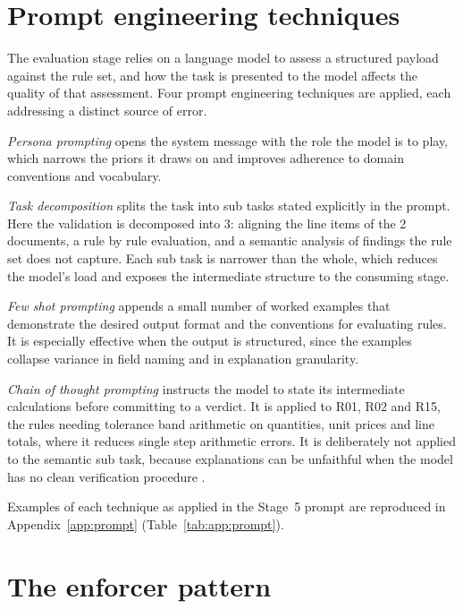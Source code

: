 \section{Prompt engineering techniques}
\label{sec:method:prompt}

The evaluation stage relies on a language model to assess a structured payload against the rule set, and how the task is presented to the model affects the quality of that assessment. Four prompt engineering techniques are applied, each addressing a distinct source of error.

\emph{Persona prompting} \citep{salewski2024} opens the system message with the role the model is to play, which narrows the priors it draws on and improves adherence to domain conventions and vocabulary.

\emph{Task decomposition} \citep{khot2023,zhou2023} splits the task into sub tasks stated explicitly in the prompt. Here the validation is decomposed into 3: aligning the line items of the 2 documents, a rule by rule evaluation, and a semantic analysis of findings the rule set does not capture. Each sub task is narrower than the whole, which reduces the model's load and exposes the intermediate structure to the consuming stage.

\emph{Few shot prompting} \citep{brown2020} appends a small number of worked examples that demonstrate the desired output format and the conventions for evaluating rules. It is especially effective when the output is structured, since the examples collapse variance in field naming and in explanation granularity.

\emph{Chain of thought prompting} \citep{wei2022} instructs the model to state its intermediate calculations before committing to a verdict. It is applied to R01, R02 and R15, the rules needing tolerance band arithmetic on quantities, unit prices and line totals, where it reduces single step arithmetic errors. It is deliberately not applied to the semantic sub task, because explanations can be unfaithful when the model has no clean verification procedure \citep{turpin2023}.

Examples of each technique as applied in the Stage~5 prompt are reproduced in Appendix~\ref{app:prompt} (Table~\ref{tab:app:prompt}).


\section{The enforcer pattern}
\label{sec:method:enforcer}

